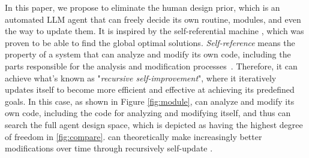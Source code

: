 In this paper, we propose \textbf{\framework} to eliminate the human design prior, which is an automated LLM agent that can freely decide its own routine, modules, and even the way to update them. 
It is inspired by the self-referential \godel machine \citep{schmidhuber2003godel}, which was proven to be able to find the global optimal solutions. 
\textit{Self-reference} means the property of a system that can analyze and modify its own code, including the parts responsible for the analysis and modification processes~\citep{astrachan1994self}. Therefore, it can achieve what's known as "\textit{recursive self-improvement}", where it iteratively updates itself to become more efficient and effective at achieving its predefined goals. In this case, as shown in Figure \ref{fig:module}, \framework can analyze and modify its own code, including the code for analyzing and modifying itself, and thus can search the full agent design space, which is depicted as having the highest degree of freedom in \cref{fig:compare}. \framework can theoretically make increasingly better modifications over time through recursively self-update \citep{wang2018formulationrecursiveselfimprovementpossible}. 




